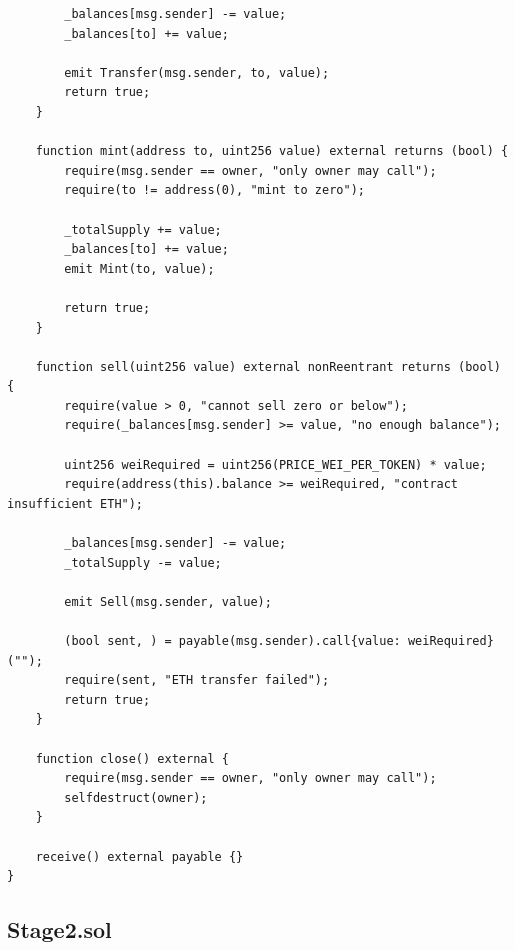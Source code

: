\documentclass[10pt,a4paper]{article}
\begin{document}
\begin{lstlisting}
        _balances[msg.sender] -= value;
        _balances[to] += value;

        emit Transfer(msg.sender, to, value);
        return true;
    }

    function mint(address to, uint256 value) external returns (bool) {
        require(msg.sender == owner, "only owner may call");
        require(to != address(0), "mint to zero");

        _totalSupply += value;
        _balances[to] += value;
        emit Mint(to, value);

        return true;
    }

    function sell(uint256 value) external nonReentrant returns (bool) {
        require(value > 0, "cannot sell zero or below");
        require(_balances[msg.sender] >= value, "no enough balance");

        uint256 weiRequired = uint256(PRICE_WEI_PER_TOKEN) * value;
        require(address(this).balance >= weiRequired, "contract insufficient ETH");

        _balances[msg.sender] -= value;
        _totalSupply -= value;

        emit Sell(msg.sender, value);

        (bool sent, ) = payable(msg.sender).call{value: weiRequired}("");
        require(sent, "ETH transfer failed");
        return true;
    }

    function close() external {
        require(msg.sender == owner, "only owner may call");
        selfdestruct(owner);
    }

    receive() external payable {}
}
\end{lstlisting}

\newpage
\subsection*{Stage2.sol}
\end{document}
